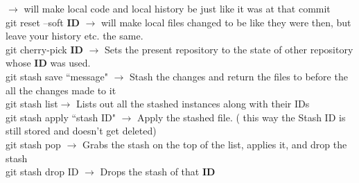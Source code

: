 \documentclass[twoside,a4paper]{article}
\newcommand{\tcb}{\color{blue}}
\newcommand{\tcr}{\color{red}}
\newcommand{\tcg}{\color{gray}}
\newcommand{\tck}{\color{black}}
\newcommand{\ra }{$\rightarrow$ }
\begin{document}
\begin{multicols}{2}
    \ra will make local code and local history be just like it
    was at that commit\\
    \tcr git reset \tcb --soft \textbf{ID} \tck
    \ra will make local files changed to be like they were then,
    but leave your history etc. the same.\\
    \tcr git \tcb cherry-pick \textbf{ID} \tck
    \ra Sets the present repository to the state of other
    repository whose \textbf{ID} was used.\\
    \tcr git stash \tcb save ``message"\tck
    \ra Stash the changes and return the files to before the all
    the changes made to it\\
    \tcr git stash \tcb list\tck $\rightarrow$
    Lists out all the stashed instances along with their IDs\\
    \tcr git stash apply \tcb ``stash ID" \tck
    \ra Apply the stashed file. \tcg  ( this way the
    Stash ID is still stored and doesn't get deleted)\\
    \tcr git stash \tcb pop \tck \ra Grabs
    the stash on the top of the list, applies it, and drop the stash\\
    \tcr git stash \tcb drop ID \tck \ra
    Drops the stash of that \textbf{ID}\\

    \vfill \null
    \newpage

\end{multicols}

\newpage
\end{document}

